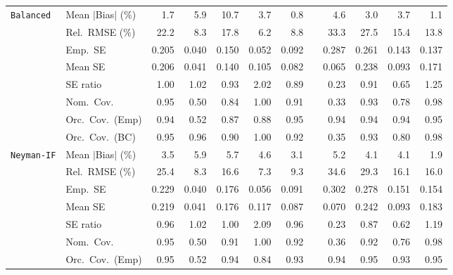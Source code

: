 \begin{landscape}
\begin{longtable}{llrrrrrrrrrr}
\addlinespace[2pt]
\quad \texttt{Balanced} & Mean $|$Bias$|$ (\%) & \cellcolor{rankthree}1.7 & 5.9 & 10.7 & 3.7 & \cellcolor{rankone}0.8 &  & 4.6 & 3.0 & 3.7 & \cellcolor{ranktwo}1.1 \\
 & Rel.\ RMSE (\%) & 22.2 & \cellcolor{ranktwo}8.3 & 17.8 & \cellcolor{rankone}6.2 & \cellcolor{rankthree}8.8 &  & 33.3 & 27.5 & 15.4 & 13.8 \\
 & Emp.\ SE & 0.205 & 0.040 & 0.150 & 0.052 & 0.092 &  & 0.287 & 0.261 & 0.143 & 0.137 \\
 & Mean SE & 0.206 & 0.041 & 0.140 & 0.105 & 0.082 &  & 0.065 & 0.238 & 0.093 & 0.171 \\
 & SE ratio & \cellcolor{rankone}1.00 & \cellcolor{ranktwo}1.02 & \cellcolor{rankthree}0.93 & 2.02 & 0.89 &  & 0.23 & 0.91 & 0.65 & 1.25 \\
 & Nom.\ Cov. & \cellcolor{rankone}0.95 & 0.50 & 0.84 & 1.00 & 0.91 &  & 0.33 & \cellcolor{ranktwo}0.93 & 0.78 & \cellcolor{rankthree}0.98 \\
 & Orc.\ Cov.\ (Emp) & \cellcolor{ranktwo}0.94 & 0.52 & 0.87 & \cellcolor{rankthree}0.88 & \cellcolor{rankone}0.95 &  & \cellcolor{ranktwo}0.94 & \cellcolor{ranktwo}0.94 & \cellcolor{ranktwo}0.94 & \cellcolor{rankone}0.95 \\
 & Orc.\ Cov.\ (BC) & \cellcolor{rankone}0.95 & \cellcolor{ranktwo}0.96 & 0.90 & 1.00 & 0.92 &  & 0.35 & \cellcolor{rankthree}0.93 & 0.80 & 0.98 \\
\addlinespace[2pt]
\quad \texttt{Neyman-IF} & Mean $|$Bias$|$ (\%) & \cellcolor{rankthree}3.5 & 5.9 & 5.7 & 4.6 & \cellcolor{ranktwo}3.1 &  & 5.2 & 4.1 & 4.1 & \cellcolor{rankone}1.9 \\
 & Rel.\ RMSE (\%) & 25.4 & \cellcolor{ranktwo}8.3 & 16.6 & \cellcolor{rankone}7.3 & \cellcolor{rankthree}9.3 &  & 34.6 & 29.3 & 16.1 & 16.0 \\
 & Emp.\ SE & 0.229 & 0.040 & 0.176 & 0.056 & 0.091 &  & 0.302 & 0.278 & 0.151 & 0.154 \\
 & Mean SE & 0.219 & 0.041 & 0.176 & 0.117 & 0.087 &  & 0.070 & 0.242 & 0.093 & 0.183 \\
 & SE ratio & \cellcolor{rankthree}0.96 & \cellcolor{ranktwo}1.02 & \cellcolor{rankone}1.00 & 2.09 & \cellcolor{rankthree}0.96 &  & 0.23 & 0.87 & 0.62 & 1.19 \\
 & Nom.\ Cov. & \cellcolor{rankone}0.95 & 0.50 & \cellcolor{rankthree}0.91 & 1.00 & \cellcolor{ranktwo}0.92 &  & 0.36 & \cellcolor{ranktwo}0.92 & 0.76 & \cellcolor{ranktwo}0.98 \\
 & Orc.\ Cov.\ (Emp) & \cellcolor{rankone}0.95 & 0.52 & \cellcolor{ranktwo}0.94 & 0.84 & \cellcolor{rankthree}0.93 &  & \cellcolor{ranktwo}0.94 & \cellcolor{rankone}0.95 & \cellcolor{rankthree}0.93 & \cellcolor{rankone}0.95 \\

\end{longtable}
\end{landscape}
